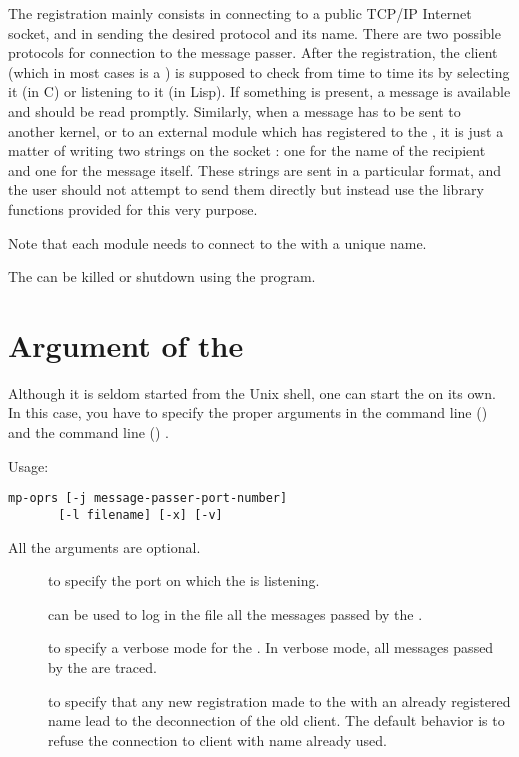 The registration mainly consists in connecting to a public TCP/IP Internet
socket, and in sending the desired protocol and its name. There are two
possible protocols for connection to the message passer. After the
registration, the client (which in most cases is a \CPK{}) is supposed to check
from time to time its  by selecting it (in C) or listening to
it (in Lisp).  If something is present, a message is available and should be
read promptly.  Similarly, when a message has to be sent to another \COPRS{}
kernel, or to an external module which has registered to the \MP{}, it is just
a matter of writing two strings on the socket : one for the
name of the recipient and one for the message itself. These strings are sent in
a particular format, and the user should not attempt to send them directly but
instead use the library functions provided for this very purpose.

Note that each module needs to connect to the \MP{} with a unique name.

The \MP{} can be killed or shutdown using the  program. 



\section{Argument of the \MP{}}


Although it is seldom started from the Unix shell, one can start the \MP{} on
its own. In this case, you have to specify the proper arguments in the
\OPRSS{} command line () and the \OPRS{}
command line () .

Usage: \begin{verbatim}
mp-oprs [-j message-passer-port-number]
       [-l filename] [-x] [-v] 
\end{verbatim}


All the arguments are optional.

\begin{description}

\item[] to specify the port on which the \MP{} is listening.

\item[] can be used to log in the file  all
the messages passed by the \MP{}.

\item[] to specify a verbose mode for the \MP{}. In verbose mode, all
messages passed by the \MP{} are traced.

\item[] to specify that any new registration made to the \MP{} with an
already registered name lead to the deconnection of the old client. The default
behavior is to refuse the connection to client with name already used.

\end{description}

